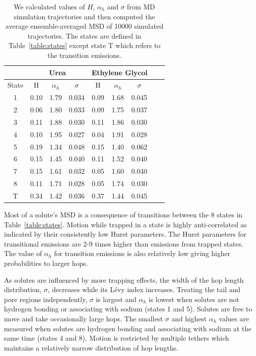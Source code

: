 \documentclass{article}
\begin{document}
  \begin{table}[h]
  \centering
  \begin{tabular}{|c|c|c|c|c|c|c|c|c|}
  \hline
  & \multicolumn{3}{c|}{Urea}                      & \multicolumn{3}{c|}{Ethylene Glycol} \\\hline
  State & H     & $\alpha_h$ & $\sigma$  & H    & $\alpha_h$ & $\sigma$ \\\hline
  1     & 0.10  & 1.79       & 0.034     & 0.09 & 1.68       & 0.045    \\
  2     & 0.06  & 1.80       & 0.033     & 0.09 & 1.75       & 0.037    \\
  3     & 0.11  & 1.88       & 0.030     & 0.11 & 1.86       & 0.030    \\
  4     & 0.10  & 1.95       & 0.027     & 0.04 & 1.91       & 0.028    \\
  5     & 0.19  & 1.34       & 0.048     & 0.15 & 1.40       & 0.062    \\
  6     & 0.15  & 1.45       & 0.040     & 0.11 & 1.52       & 0.040    \\
  7     & 0.15  & 1.61       & 0.032     & 0.05 & 1.60       & 0.040    \\
  8     & 0.11  & 1.71       & 0.028     & 0.05 & 1.74       & 0.030    \\
  T     & 0.34  & 1.42       & 0.036     & 0.37 & 1.44       & 0.045    \\\hline
  \end{tabular}
  \caption{We calculated values of $H$, $\alpha_h$ and $\sigma$ from MD simulation
  trajectories and then computed the average ensemble-averaged MSD of 10000 
  simulated trajectories. The states are defined in Table~\ref{table:states}
  except state T which refers to the transition emissions.}\label{table:msddm_params}
  \end{table}

  Most of a solute's MSD is a consequence of transitions between the 8 states
  in Table~\ref{table:states}. Motion while trapped in a state is highly 
  anti-correlated as indicated by their consistently low Hurst parameters.
  The Hurst parameters for transitional emissions are 2-9 times higher than
  emissions from trapped states. The value of $\alpha_h$ for transition 
  emissions is also relatively low giving higher probabilities to larger hops.
  
  As solutes are influenced by more trapping effects, the width of the hop length
  distribution, $\sigma$, decreases while its L\'evy index increases. Treating the
  tail and pore regions independently, $\sigma$ is largest and $\alpha_h$ is lowest
  when solutes are not hydrogen bonding or associating with sodium (states 1 and 5).
  Solutes are free to move and take occasionally large hops. The smallest $\sigma$
  and highest $\alpha_h$ values are measured when solutes are hydrogen bonding and 
  associating with sodium at the same time (states 4 and 8). Motion is restricted 
  by multiple tethers which maintains a relatively narrow distribution of hop lengths.
  
\end{document}
